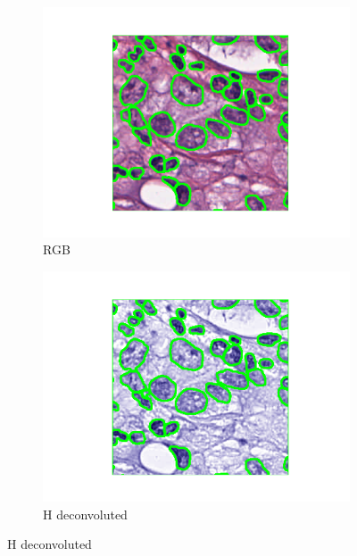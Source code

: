 \documentclass[target=bach,aauheader=,style=]{thud}
\begin{document}
\begin{figure}[!htbp]
\begin{subfigure}{0.48\textwidth}
  \centering
  \includegraphics[width=\linewidth]{imgs/qualitative/medium/RGB/contour_img.png}
  \caption{RGB}
\end{subfigure}\hfill
\begin{subfigure}{0.48\textwidth}
  \centering
  \includegraphics[width=\linewidth]{imgs/qualitative/medium/HE/contour_img.png}
  \caption{H deconvoluted}
\end{subfigure}


\end{figure}
\end{document}
